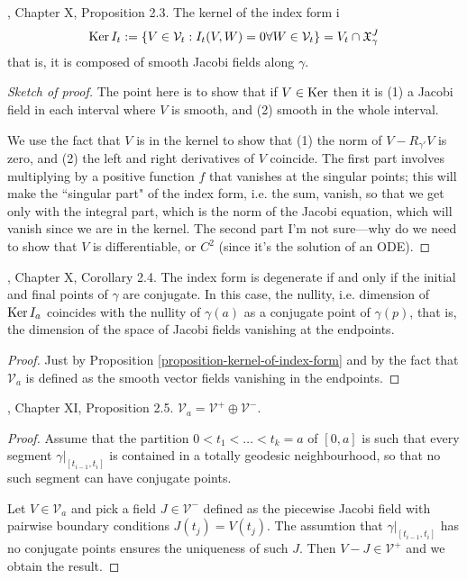 \begin{proposition}
\label{proposition-kernel-of-index-form}
\cite{doc}, Chapter X, Proposition 2.3. The kernel of the index form i
$$
\mathop{\mathrm{Ker}} I_t:=\{V \in \mathcal{V}_t:I_t(V,W)=0\forall W\in\mathcal{V}_t\}=
V_t \cap \mathfrak{X}_\gamma^J 
$$
that is, it is composed of smooth Jacobi fields along $\gamma$.
\end{proposition}

\begin{proof}[Sketch of proof]
The point here is to show that if $V \in \mathop{\mathrm{Ker}}$ then it is (1) a Jacobi
 field in each interval where $V$ is smooth, and (2) smooth in the whole
 interval.

We use the fact that $V$ is in the kernel to show that (1) the norm of 
$V-R_{\gamma'}V$ is zero, and (2) the left and right derivatives of $V$
coincide. The first part involves multiplying by a positive function $f$ that
vanishes at the singular points; this will make the ``singular part" of the
index form, i.e. the sum, vanish, so that we get only with the integral part,
which is the norm of the Jacobi equation, which will vanish since we are in the
kernel. The second part I'm not sure---why do we need to show that $V$ is
differentiable, or $C^2$ (since it's the solution of an ODE).
\end{proof}

\begin{lemma}
\label{lemma-index-form-is-degenerate-iff-conjugate-points}
\cite{doc}, Chapter X, Corollary 2.4. The index form is degenerate if and only 
if the initial and final points of $\gamma$ are conjugate. In this case, the 
nullity, i.e. dimension of $\mathop{\mathrm{Ker}} I_a$ coincides with the nullity of $\gamma(a)$ 
as a conjugate point of $\gamma(p)$, that is, the dimension of the space of 
Jacobi fields vanishing at the endpoints.
\end{lemma}

\begin{proof}
Just by Proposition \ref{proposition-kernel-of-index-form} and by the fact that
$\mathcal{V}_a$ is defined as the smooth vector fields vanishing in the
endpoints.
\end{proof}

\begin{proposition}
\label{proposition-V-is-direct-sum}
\cite{doc}, Chapter XI, Proposition 2.5. 
$\mathcal{V}_a=\mathcal{V}^+ \oplus \mathcal{V}^-$.
\end{proposition}

\begin{proof}
Assume that the partition $0<t_1<\ldots<t_k=a$ of $[0,a]$ is such that every
segment $\gamma|_{[t_{i-1},t_i]}$ is contained in a totally geodesic
neighbourhood, so that no such segment can have conjugate points.

Let $V \in \mathcal{V}_a$ and pick a field $J \in \mathcal{V}^-$ defined as the
piecewise Jacobi field with pairwise boundary conditions $J(t_j)=V(t_j)$. The
assumtion that $\gamma|_{[t_{i-1},t_i]}$ has no conjugate points ensures the
uniqueness of such $J$. Then $V-J\in\mathcal{V}^+$ and we obtain the result.
\end{proof}

